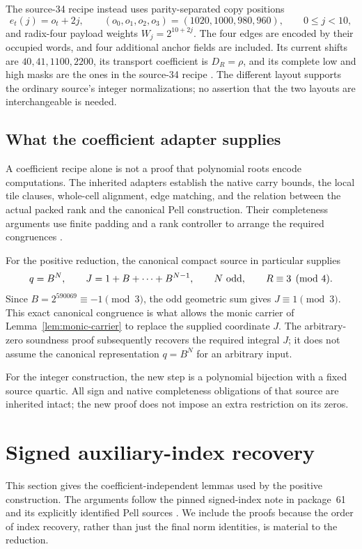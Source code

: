\documentclass[11pt,a4paper]{article}
\theoremstyle{definition}
\begin{document}
The source-34 recipe instead uses parity-separated copy positions
\[
 e_t(j)=o_t+2j,\qquad
 (o_0,o_1,o_2,o_3)=(1020,1000,980,960),
 \qquad 0\le j<10,
\]
and radix-four payload weights \(W_j=2^{10+2j}\).  The four edges are
encoded by their occupied words, and four additional anchor fields
are included.  Its current shifts are \(40,41,1100,2200\), its
transport coefficient is \(D_R=\rho\), and its complete low and high
masks are the ones in the source-34 recipe \cite{source34}.
The different layout supports the ordinary source's integer
normalizations; no assertion that the two layouts are interchangeable
is needed.

\subsection{What the coefficient adapter supplies}

A coefficient recipe alone is not a proof that polynomial roots encode
computations.  The inherited adapters establish the native carry
bounds, the local tile clauses, whole-cell alignment, edge matching,
and the relation between the actual packed rank and the canonical
Pell construction.  Their completeness arguments use finite padding
and a rank controller to arrange the required congruences
\cite{source34,source44,pell-audit}.

For the positive reduction, the canonical compact source in particular
supplies
\[
 q=B^N,\qquad
 J=1+B+\cdots+B^{N-1},\qquad
 N\ \hbox{odd},\qquad R\equiv3\pmod4.
\]
Since \(B=2^{590069}\equiv-1\pmod3\), the odd geometric sum gives
\(J\equiv1\pmod3\).  This exact canonical congruence is what allows the
monic carrier of Lemma~\ref{lem:monic-carrier} to replace the supplied
coordinate \(J\).  The arbitrary-zero soundness proof subsequently
recovers the required integral \(J\); it does not assume the
canonical representation \(q=B^N\) for an arbitrary input.

For the integer construction, the new step is a polynomial bijection
with a fixed source quartic.  All sign and native completeness
obligations of that source are inherited intact; the new proof does
not impose an extra restriction on its zeros.

\section{Signed auxiliary-index recovery}
\label{sec:signed-index}

This section gives the coefficient-independent lemmas used by the
positive construction.  The arguments follow the pinned signed-index
note in package~61 and its explicitly identified Pell sources
\cite{signed-index,pell-audit}.  We include the proofs because the order
of index recovery, rather than just the final norm identities, is
material to the reduction.
\end{document}
